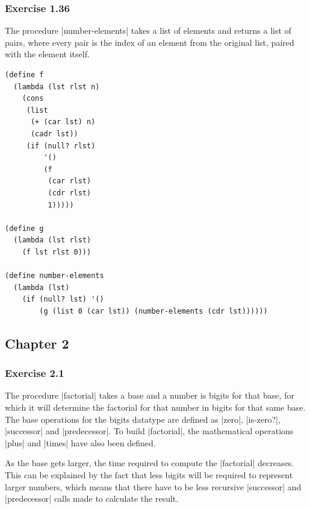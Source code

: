 \documentclass[a4paper]{article}
\begin{document}
\subsubsection{Exercise 1.36}

The procedure |number-elements| takes a list of elements and returns a list of pairs, where every pair is the index of an element from the original list, paired with the element itself.

\begin{lstlisting}
(define f
  (lambda (lst rlst n)
    (cons
     (list
      (+ (car lst) n)
      (cadr lst))
     (if (null? rlst)
         '()
         (f
          (car rlst)
          (cdr rlst)
          1)))))

(define g
  (lambda (lst rlst)
    (f lst rlst 0)))

(define number-elements
  (lambda (lst)
    (if (null? lst) '()
        (g (list 0 (car lst)) (number-elements (cdr lst))))))
\end{lstlisting}

\newpage

\subsection{Chapter 2}

\subsubsection{Exercise 2.1}

The procedure |factorial| takes a base and a number is bigits for that base, for which it will determine the factorial for that number in bigits for that same base. The base operations for the bigits datatype are defined as |zero|, |is-zero?|, |successor| and |predecessor|. To build |factorial|, the mathematical operations |plus| and |times| have also been defined.

As the base gets larger, the time required to compute the |factorial| decreases. This can be explained by the fact that less bigits will be required to represent larger numbers, which means that there have to be less recursive |successor| and |predecessor| calls made to calculate the result.
\end{document}
